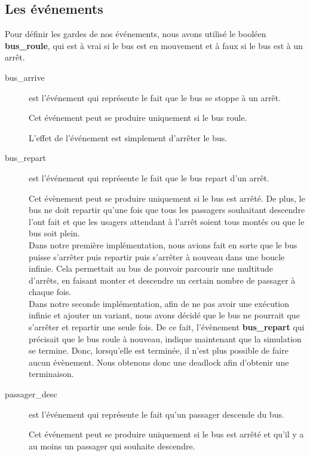 \documentclass[a4paper,titlepage]{report}
\begin{document}
	\subsection{Les événements}
		Pour définir les gardes de nos événements, nous avons utilisé le booléen \textbf{bus\_roule}, qui est à vrai si le bus est en mouvement et à faux si le bus est à un arrêt.\\
		
		\begin{description}
			\item[bus\_arrive] est l'événement qui représente le fait que le bus se stoppe à un arrêt.
			
			Cet événement peut se produire uniquement si le bus roule. 
			
			L'effet de l'événement est simplement d'arrêter le bus.\\
		
			\item[bus\_repart] est l'événement qui représente le fait que le bus repart d'un arrêt.
			
			Cet évènement peut se produire uniquement si le bus est arrêté. De plus, le bus ne doit repartir qu'une fois que tous les passagers souhaitant descendre l'ont fait et que les usagers attendant à l'arrêt soient tous montés ou que le bus soit plein. \\
			
			Dans notre première implémentation, nous avions fait en sorte que le bus puisse s'arrêter puis repartir puis s'arrêter à nouveau dans une boucle infinie. Cela permettait au bus de pouvoir parcourir une multitude d'arrêts, en faisant monter et descendre un certain nombre de passager à chaque fois.\\
			
			Dans notre seconde implémentation, afin de ne pas avoir une exécution infinie et ajouter un variant, nous avons décidé que le bus ne pourrait que s'arrêter et repartir une seule fois. De ce fait, l'évènement \textbf{bus\_repart} qui précisait que le bus roule à nouveau, indique maintenant que la simulation se termine. Donc, lorsqu'elle est terminée, il n'est plus possible de faire aucun évènement. Nous obtenons donc une deadlock afin d'obtenir une terminaison.
			


			\item[passager\_desc] est l'événement qui représente le fait qu'un passager descende du bus.
			
			Cet événement peut se produire uniquement si le bus est arrêté et qu'il y a au moins un passager qui souhaite descendre.
			

\end{description}
\end{document}
